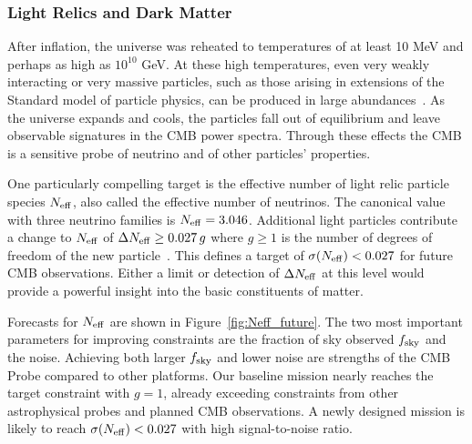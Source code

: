 \vspace{-0.15in}

\subsubsection{Light Relics and Dark Matter}

\vspace{-0.05in}

After inflation, the universe was reheated to temperatures of at least 10 MeV and perhaps as high as $10^{10}$ GeV.  
At these high temperatures, even very weakly interacting or very massive particles, such as those arising 
in extensions of the Standard model of particle physics, can be produced in large abundances~\cite{1979ARNPS..29..313S,Bolz:2000fu}.  As the universe expands and cools, 
the particles fall out of equilibrium and leave observable signatures in the \ac{CMB} power spectra. 
Through these effects the CMB is a sensitive probe of neutrino and of other particles' properties.  

One particularly compelling target is the effective number of light relic particle species ${N_{\rm eff}}$, also called the effective 
number of neutrinos. The canonical value with three neutrino families is ${N_{\rm eff}} = 3.046$. Additional light particles 
contribute a change to ${N_{\rm eff}}$ of $\Delta {N_{\rm eff}} \geq 0.027\,g$ where $g \geq 1$ is the number of 
degrees of freedom of the new particle~\cite{Brust:2013xpv,Baumann:2016wac}.  
This defines a target of $\sigma({N_{\rm eff}}) < 0.027$ for future CMB observations. 
Either a limit or detection of $\Delta {N_{\rm eff}}$ at this level would provide a powerful insight into the basic constituents 
of matter. 

Forecasts for ${N_{\rm eff}}$ are shown in Figure~\ref{fig:Neff_future}.  The two most important parameters for improving constraints
are the fraction of sky observed $f_{\rm sky}$ and the noise. Achieving both larger $f_{\rm sky}$ and
lower noise are strengths of the CMB Probe compared to other platforms. 
Our baseline mission nearly reaches the target constraint with $g=1$, already exceeding constraints 
from other astrophysical probes and planned CMB observations.
A newly designed mission is likely to reach $\sigma({N_{\rm eff}}) < 0.027$ with high signal-to-noise ratio. 

